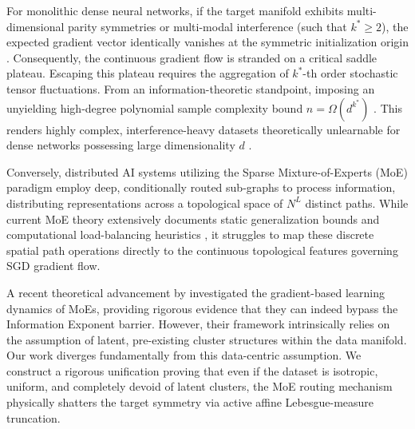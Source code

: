 \documentclass{article}
\newcommand{\1}{\mathbb{I}}
\begin{document}
For monolithic dense neural networks, if the target manifold exhibits multi-dimensional parity symmetries or multi-modal interference (such that $k^* \ge 2$), the expected gradient vector identically vanishes at the symmetric initialization origin \citep{damian2022neural}. Consequently, the continuous gradient flow is stranded on a critical saddle plateau. Escaping this plateau requires the aggregation of $k^*$-th order stochastic tensor fluctuations. From an information-theoretic standpoint, imposing an unyielding high-degree polynomial sample complexity bound $n = \Omega(d^{k^*})$ \citep{benarous2021online}. This renders highly complex, interference-heavy datasets theoretically unlearnable for dense networks possessing large dimensionality $d$ \citep{dandi2024how, joshi2024complexity}.

Conversely, distributed AI systems utilizing the Sparse Mixture-of-Experts (MoE) \citep{shazeer2017outrageously, jiang2024mixtral, deepseek2024v3} paradigm employ deep, conditionally routed sub-graphs to process information, distributing representations across a topological space of $N^L$ distinct paths. While current MoE theory extensively documents static generalization bounds and computational load-balancing heuristics \citep{fedus2022switch}, it struggles to map these discrete spatial path operations directly to the continuous topological features governing SGD gradient flow.

A recent theoretical advancement by \cite{kawata2025mixture} investigated the gradient-based learning dynamics of MoEs, providing rigorous evidence that they can indeed bypass the Information Exponent barrier. However, their framework intrinsically relies on the assumption of latent, pre-existing cluster structures within the data manifold. Our work diverges fundamentally from this data-centric assumption. We construct a rigorous unification proving that even if the dataset is isotropic, uniform, and completely devoid of latent clusters, the MoE routing mechanism physically shatters the target symmetry via active affine Lebesgue-measure truncation.
\end{document}
